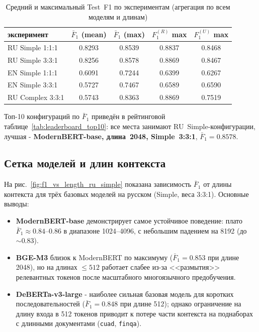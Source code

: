 \begin{table}[H]
\centering
\small
\caption{Средний и максимальный Test~F1 по экспериментам (агрегация по всем моделям и длинам)}
\label{tab:per_experiment_summary}
\begin{tabular}{lcccc}
\toprule
эксперимент & $\bar{F}_1$ (mean) & $\bar{F}_1$ (max) & $F_1^{(R)}$ max & $F_1^{(U)}$ max \\
\midrule
RU Simple 1:1:1   & 0.8293 & 0.8539 & 0.8837 & 0.8468 \\
RU Simple 3:3:1   & 0.8256 & 0.8578 & 0.8869 & 0.8467 \\
EN Simple 1:1:1   & 0.6091 & 0.7244 & 0.6399 & 0.6267 \\
EN Simple 3:3:1   & 0.5727 & 0.7467 & 0.6589 & 0.6590 \\
RU Complex 3:3:1  & 0.5743 & 0.8363 & 0.8869 & 0.7519 \\
\bottomrule
\end{tabular}
\end{table}

Топ-10 конфигураций по $\bar{F}_1$ приведён в рейтинговой таблице~\ref{tab:leaderboard_top10}: все места занимают RU~Simple-конфигурации, лучшая - \textbf{ModernBERT-base, длина~2048, Simple~3:3:1}, $\bar{F}_1 = 0.8578$.



\subsection{Сетка моделей и длин контекста}
\label{sec:grid}

На рис.~\ref{fig:f1_vs_length_ru_simple} показана зависимость $\bar{F}_1$ от длины контекста для трёх базовых моделей на русском (Simple, веса 3:3:1). Основные выводы:

\begin{itemize}
  \item \textbf{ModernBERT-base} демонстрирует самое устойчивое поведение: 
  плато $\bar{F}_1 \approx 0.84\text{--}0.86$ в диапазоне 1024--4096, 
  с небольшим падением на 8192 (до $\sim 0.83$).
  \item \textbf{BGE-M3} близок к ModernBERT по максимуму 
  ($\bar{F}_1 = 0.853$ при длине 2048), но на длинах $\le 512$ работает слабее из-за <<размытия>> релевантных токенов после масштабного многоязычного предобучения.
 \item \textbf{DeBERTa-v3-large} - наиболее сильная базовая модель
 для коротких последовательностей ($\bar{F}_1 = 0.848$ при длине 512);
 однако ограничение на длину входа в 512 токенов приводит к потере части контекста на
 поднаборах с длинными документами (\texttt{cuad}, \texttt{finqa}).
\end{itemize}

